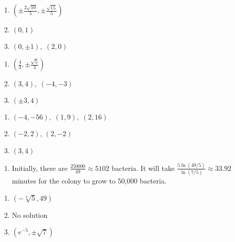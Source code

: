 \documentclass{ximera}
\begin{document}
\begin{multicols}{3}
\begin{enumerate}
\setcounter{enumi}{\value{HW}}

\item $\left( \pm \frac{2 \sqrt{10}}{5}, \pm \frac{\sqrt{15}}{5} \right)$
\item $(0, 1)$
\item $(0, \pm 1), \; (2, 0)$


\setcounter{HW}{\value{enumi}}
\end{enumerate}
\end{multicols}

\begin{multicols}{3}
\begin{enumerate}
\setcounter{enumi}{\value{HW}}
\item $\left( \frac{4}{3}, \pm \frac{\sqrt{5}}{3} \right)$
\item $(3, 4), \; (-4, -3)$
\item $(\pm 3, 4)$
\setcounter{HW}{\value{enumi}}
\end{enumerate}
\end{multicols}

\begin{multicols}{3}
\begin{enumerate}
\setcounter{enumi}{\value{HW}}

\item $(-4, -56), \; (1, 9), \; (2, 16)$
\item $(-2,2)$, $(2,-2)$
\item $(3, 4)$

\setcounter{HW}{\value{enumi}}
\end{enumerate}
\end{multicols}


\begin{enumerate}
\setcounter{enumi}{\value{HW}}

\item  Initially, there are $\frac{250000}{49} \approx 5102$ bacteria.  It will take $\frac{5\ln(49/5)}{\ln(7/5)} \approx 33.92$ minutes for the colony to grow to 50,000 bacteria.

\setcounter{HW}{\value{enumi}}
\end{enumerate}


\begin{multicols}{3}
\begin{enumerate}
\setcounter{enumi}{\value{HW}}

\item $\left( -\sqrt[3]{5}, 49 \right)$
\item No solution
\item $\left( e^{-5}, \pm \sqrt{7} \right)$

\setcounter{HW}{\value{enumi}}
\end{enumerate}
\end{multicols}
\end{document}
